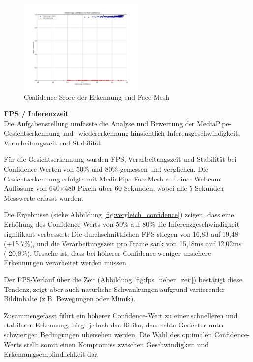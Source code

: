 \begin{figure}[ht]
    \centering
    \includegraphics[width=0.55\textwidth]{data/Detection_vs_Mesh_Confidence.png}
    \caption{Confidence Score der Erkennung und Face Mesh}
    \label{fig:confidence_score_mediapipe}
\end{figure}

\textbf{FPS / Inferenzzeit} \\

Die Aufgabenstellung umfasste die Analyse und Bewertung der MediaPipe-Gesichtserkennung und -wiedererkennung hinsichtlich Inferenzgeschwindigkeit, Verarbeitungszeit und Stabilität.

Für die Gesichtserkennung wurden FPS, Verarbeitungszeit und Stabilität bei Confidence-Werten von 50\% und 80\% gemessen und verglichen. Die Gesichtserkennung erfolgte mit MediaPipe FaceMesh auf einer Webcam-Auflösung von 640×480 Pixeln über 60 Sekunden, wobei alle 5 Sekunden Messwerte erfasst wurden.

Die Ergebnisse (siehe Abbildung \ref{fig:vergleich_confidence}) zeigen, dass eine Erhöhung des Confidence-Werts von 50\% auf 80\% die Inferenzgeschwindigkeit signifikant verbessert: Die durchschnittlichen FPS stiegen von 16,83 auf 19,48 (+15,7\%), und die Verarbeitungszeit pro Frame sank von 15,18ms auf 12,02ms (-20,8\%). Ursache ist, dass bei höherer Confidence weniger unsichere Erkennungen verarbeitet werden müssen.

Der FPS-Verlauf über die Zeit (Abbildung \ref{fig:fps_ueber_zeit}) bestätigt diese Tendenz, zeigt aber auch natürliche Schwankungen aufgrund variierender Bildinhalte (z.B. Bewegungen oder Mimik).

Zusammengefasst führt ein höherer Confidence-Wert zu einer schnelleren und stabileren Erkennung, birgt jedoch das Risiko, dass echte Gesichter unter schwierigen Bedingungen übersehen werden. Die Wahl des optimalen Confidence-Werts stellt somit einen Kompromiss zwischen Geschwindigkeit und Erkennungsempfindlichkeit dar.

